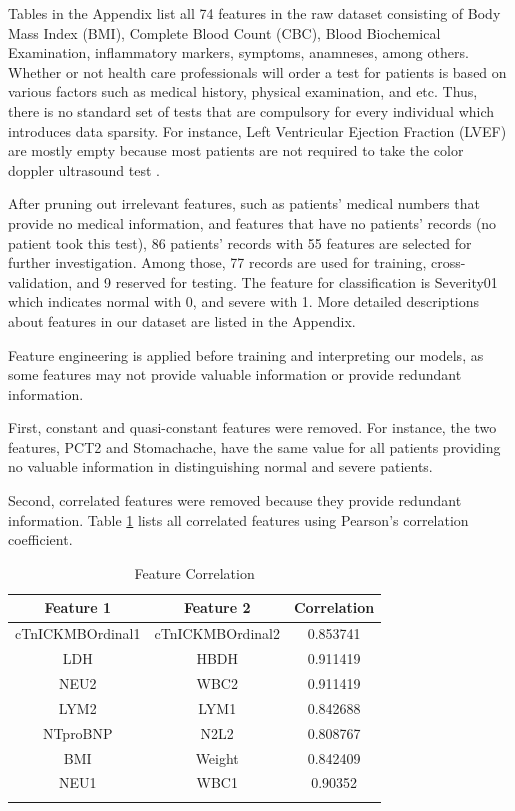 Tables in the Appendix list all 74 features in the raw dataset consisting of Body Mass Index (BMI), Complete Blood Count (CBC), Blood Biochemical Examination, inflammatory markers, symptoms, anamneses, among others. Whether or not health care professionals will order a test for patients is based on various factors such as medical history, physical examination, and etc. Thus, there is no standard set of tests that are compulsory for every individual which introduces data sparsity. For instance, Left Ventricular Ejection Fraction (LVEF) are mostly empty because most patients are not required to take the color doppler ultrasound test .

\color{black}
After pruning out irrelevant features, such as patients' medical numbers that provide no medical information, and features that have no patients' records (no patient took this test), 86 patients' records with 55 features are selected for further investigation. Among those, 77 records are used for training, cross-validation, and 9 reserved for testing. The feature for classification is Severity01 which indicates normal with 0, and severe with 1. More detailed descriptions about features in our dataset are listed in the Appendix.

Feature engineering is applied before training and interpreting our models, as some features may not provide valuable information or provide redundant information.

First, constant and quasi-constant features were removed. For instance, the two features, PCT2 and Stomachache, have the same value for all patients providing no valuable information in distinguishing normal and severe patients.


Second, correlated features were removed because they provide redundant information. Table \ref{tab:feature_correlation} lists all correlated features using Pearson’s correlation coefficient. 


\begin{table}[H]
\centering
\caption{Feature Correlation}
\begin{tabular}{@{}ccc@{}}
\toprule
Feature 1    & Feature 2 & Correlation\\ \midrule
cTnICKMBOrdinal1 & cTnICKMBOrdinal2             & 0.853741       \\
LDH & HBDH             &  0.911419   \\
NEU2           & WBC2             &  0.911419  \\
LYM2       & LYM1             & 0.842688    \\ 
NTproBNP       & N2L2             & 0.808767   \\ 
BMI       & Weight             & 0.842409    \\  
NEU1       & WBC1             & 0.90352    \\  \bottomrule
\label{tab:feature_correlation}
\end{tabular}
\end{table}



